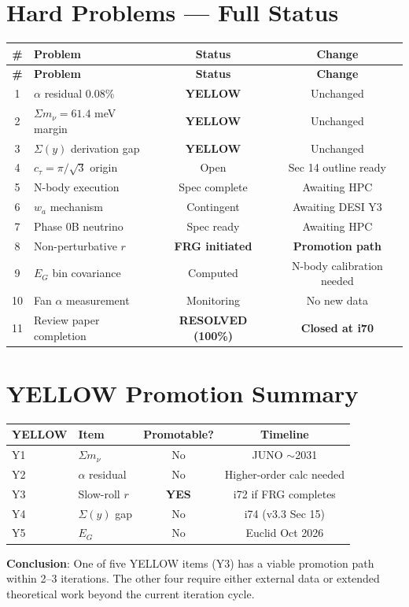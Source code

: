 \documentclass[11pt,a4paper]{article}
\newcommand{\YELLOW}{\textcolor{dfdyellow}{\textbf{YELLOW}}}
\begin{document}
\section{Hard Problems --- Full Status}

\begin{center}
\begin{longtable}{clcc}
\toprule
\textbf{\#} & \textbf{Problem} & \textbf{Status} & \textbf{Change} \\
\midrule
\endfirsthead
\toprule
\textbf{\#} & \textbf{Problem} & \textbf{Status} & \textbf{Change} \\
\midrule
\endhead
1 & $\alpha$ residual 0.08\% & \YELLOW & Unchanged \\
2 & $\Sigma m_\nu = 61.4$ meV margin & \YELLOW & Unchanged \\
3 & $\Sigma(y)$ derivation gap & \YELLOW & Unchanged \\
4 & $c_\tau = \pi/\sqrt{3}$ origin & Open & Sec 14 outline ready \\
5 & N-body execution & Spec complete & Awaiting HPC \\
6 & $w_a$ mechanism & Contingent & Awaiting DESI Y3 \\
7 & Phase 0B neutrino & Spec ready & Awaiting HPC \\
8 & Non-perturbative $r$ & \textbf{FRG initiated} & \textbf{Promotion path} \\
9 & $E_G$ bin covariance & Computed & N-body calibration needed \\
10 & Fan $\alpha$ measurement & Monitoring & No new data \\
11 & Review paper completion & \textbf{RESOLVED (100\%)} & \textbf{Closed at i70} \\
\bottomrule
\end{longtable}
\end{center}


\section{YELLOW Promotion Summary}

\begin{center}
\begin{tabular}{llcc}
\toprule
\textbf{YELLOW} & \textbf{Item} & \textbf{Promotable?} & \textbf{Timeline} \\
\midrule
Y1 & $\Sigma m_\nu$ & No & JUNO $\sim$2031 \\
Y2 & $\alpha$ residual & No & Higher-order calc needed \\
Y3 & Slow-roll $r$ & \textbf{YES} & i72 if FRG completes \\
Y4 & $\Sigma(y)$ gap & No & i74 (v3.3 Sec 15) \\
Y5 & $E_G$ & No & Euclid Oct 2026 \\
\bottomrule
\end{tabular}
\end{center}

\textbf{Conclusion}: One of five YELLOW items (Y3) has a viable promotion path within 2--3 iterations. The other four require either external data or extended theoretical work beyond the current iteration cycle.
\end{document}
